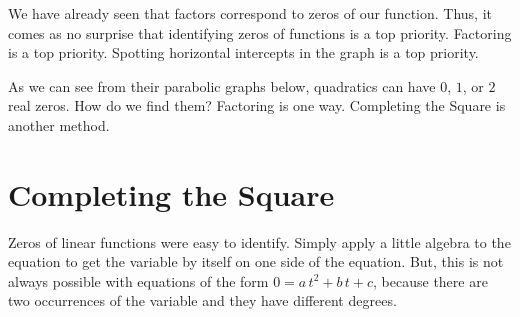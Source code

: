 \documentclass{ximera}
\begin{document}
We have already seen that factors correspond to zeros of our function. Thus, it comes as no surprise that identifying zeros of functions is a top priority.  Factoring is a top priority. Spotting horizontal intercepts in the graph is a top priority.

As we can see from their parabolic graphs below, quadratics can have $0$, $1$, or $2$ real zeros.  How do we find them? Factoring is one way.  Completing the Square is another method.







\begin{image}
\end{image}
















\section{Completing the Square}

Zeros of linear functions were easy to identify.  Simply apply a little algebra to the equation to get the variable by itself on one side of the equation.  But, this is not always possible with equations of the form $0 = a \, t^2 + b \, t + c $, because there are two occurrences of the variable and they have different degrees. \\
\end{document}
